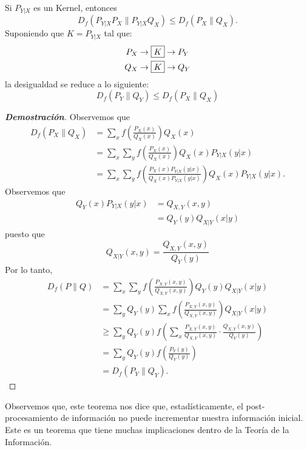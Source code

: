 \begin{theorem}
Si $P_{Y|X}$ es un Kernel, entonces
\begin{equation*}
    D_f(P_{Y|X}P_X\|P_{Y|X}Q_{X})\leq D_f(P_X\|Q_X).
\end{equation*}
Suponiendo que $K=P_{Y|X}$ tal que:
\begin{align*}
    P_X&\to\fbox{$K$}\to P_Y\\
    Q_X&\to\fbox{$K$}\to Q_Y
\end{align*}
la desigualdad se reduce a lo siguiente:
\begin{equation*}
    D_f(P_Y\|Q_Y)\leq D_f(P_X\|Q_X)
\end{equation*}
\end{theorem}
\begin{proof}[\textbf{Demostraci\'on}]
Observemos que
\begin{align*}
    D_f(P_X\|Q_X)&=\sum_{x}f\left(\frac{P_X(x)}{Q_X(x)}\right)Q_X(x)\\
    &=\sum_x\sum_y f\left(\frac{P_X(x)}{Q_X(x)}\right)Q_X(x)P_{Y|X}(y|x)\\
    &=\sum_x\sum_y f\left(\frac{P_X(x)P_{Y|X}(y|x)}{Q_X(x)P_{Y|X}(y|x)}\right)Q_X(x)P_{Y|X}(y|x).
\end{align*}
Observemos que
\begin{align*}
    Q_Y(x)P_{Y|X}(y|x)&=Q_{X,Y}(x,y)\\
    &=Q_Y(y)Q_{X|Y}(x|y)
\end{align*}
puesto que
\begin{equation*}
    Q_{X|Y}(x,y)=\frac{Q_{X,Y}(x,y)}{Q_Y(y)}
\end{equation*}
Por lo tanto,
\begin{align*}
    D_f(P\|Q)&=\sum_x\sum_y f\left(\frac{P_{X,Y}(x,y)}{Q_{X,Y}(x,y)}\right)Q_Y(y)Q_{X|Y}(x|y)\\
    &=\sum_y Q_Y(y)\sum_x f\left(\frac{P_{X,Y}(x,y)}{Q_{X,Y}(x,y)}\right)Q_{X|Y}(x|y)\\
    &\geq\sum_y Q_Y(y) f\left(\sum_{x}\frac{P_{X,Y}(x,y)}{Q_{X,Y}(x,y)}\cdot\frac{Q_{X,Y}(x,y)}{Q_Y(y)}\right)\\
    &=\sum_y Q_Y(y) f\left(\frac{P_Y(y)}{Q_Y(y)}\right)\\
    &=D_f(P_Y\|Q_Y).
\end{align*}
\end{proof}

Observemos que, este teorema nos dice que, estad\'isticamente, el post-procesamiento de informaci\'on no puede incrementar nuestra informaci\'on inicial. Este es un teorema que tiene muchas implicaciones dentro de la Teor\'ia de la Informaci\'on.